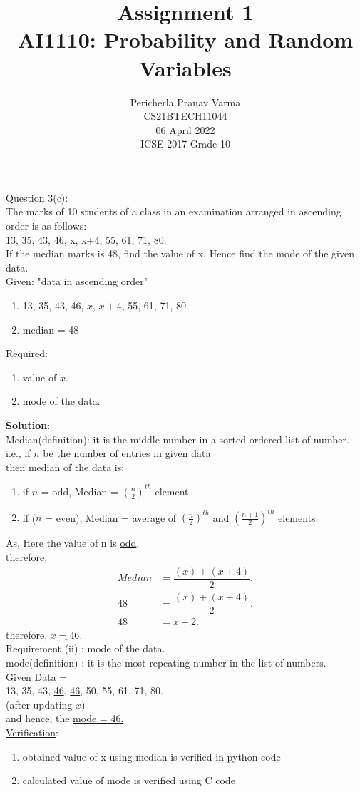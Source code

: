 \documentclass[journal,12pt,twocolumn]{IEEEtran}
\title{Assignment 1 \\ \Large AI1110: Probability and Random Variables \\ }
\author{Pericherla Pranav Varma \\ \normalsize CS21BTECH11044 \\ \vspace*{20pt} \normalsize  06 April 2022 \\ \vspace*{20pt} \Large ICSE 2017 Grade 10}
\begin{document}
\maketitle
\doublespacing
Question 3(c):\\
The marks of 10 students of a class in an examination arranged in ascending order
is as follows:\\
13, 35, 43, 46, x, x+4, 55, 61, 71, 80.\\
If the median marks is 48, find the value of x. Hence find the mode of the given
data.\\[9pt]
Given: "data in ascending order"
\begin{enumerate}[label=(\roman*)]
	\item 13, 35, 43, 46, $x$, $x+4$, 55, 61, 71, 80.
	\item median = 48
\end{enumerate}
Required: 
\begin{enumerate}[label=(\roman*)]	
	\item value of $x$.
	\item mode of the data.
\end{enumerate}
\textbf{Solution}:\\[8pt]
Median(definition): it is the middle number in a sorted ordered list of number. \\

i.e., if $n$ be the number of entries in given data\\
then median of the data is:\\
\begin{enumerate}[label=(\roman*)]
\item if $n$ = odd, Median = $(\frac{n}{2})^{th}$ element.\\
\item if ($n$ = even), Median = average of $(\frac{n}{2})^{th}$ and $(\frac{n+1}{2})^{th}$ elements.\\[6pt]
\end{enumerate}
As, Here the value of n is \underline{odd}.\\
	therefore,\\
	\begin{align}
	Median &= \dfrac{(x)+(x+4)}{2}.\\
	  48 &= \dfrac{(x)+(x+4)}{2}.\\
	  48 &= x+2.
	\end{align}	
	therefore, $ \underline{x=46.}$ \\[10pt]
Requirement (ii) : mode of the data. \\[4pt]
mode(definition) : it is the most repeating number in the list of numbers.\\[2pt]
Given 	Data = \\13, 35, 43, \underline{46}, \underline{46}, 50, 55, 61, 71, 80.\\(after updating $x$)\\
and hence, the \underline{mode = 46.}\\
\underline{Verification}:
\begin{enumerate}[label=(\roman*)]
	\item obtained value of x using median is verified in python code
	\item calculated value of mode is verified using C code
\end{enumerate}
\end{document}

